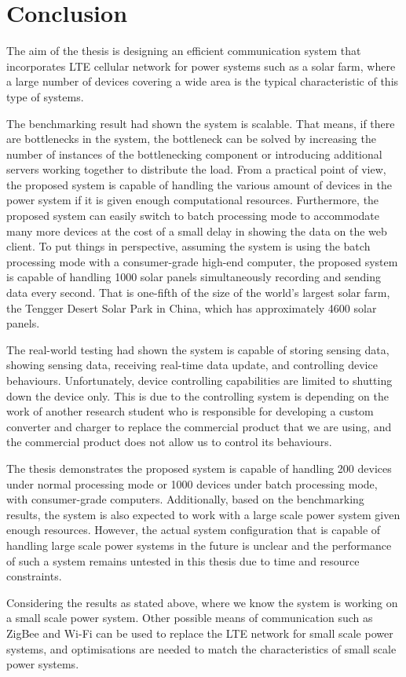 \documentclass[../thesis.tex]{subfiles}
\begin{document}
\chapter{Conclusion}
\label{chap:conclu}

The aim of the thesis is designing an efficient communication system that incorporates LTE cellular network for power systems such as a solar farm, where a large number of devices covering a wide area is the typical characteristic of this type of systems.

The benchmarking result had shown the system is scalable. That means, if there are bottlenecks in the system, the bottleneck can be solved by increasing the number of instances of the bottlenecking component or introducing additional servers working together to distribute the load. From a practical point of view, the proposed system is capable of handling the various amount of devices in the power system if it is given enough computational resources. Furthermore, the proposed system can easily switch to batch processing mode to accommodate many more devices at the cost of a small delay in showing the data on the web client. To put things in perspective, assuming the system is using the batch processing mode with a consumer-grade high-end computer, the proposed system is capable of handling 1000 solar panels simultaneously recording and sending data every second. That is one-fifth of the size of the world's largest solar farm, the Tengger Desert Solar Park in China, which has approximately 4600 solar panels\cite{gienergy}.

The real-world testing had shown the system is capable of storing sensing data, showing sensing data, receiving real-time data update, and controlling device behaviours. Unfortunately, device controlling capabilities are limited to shutting down the device only. This is due to the controlling system is depending on the work of another research student who is responsible for developing a custom converter and charger to replace the commercial product that we are using, and the commercial product does not allow us to control its behaviours.

The thesis demonstrates the proposed system is capable of handling 200 devices under normal processing mode or 1000 devices under batch processing mode, with consumer-grade computers. Additionally, based on the benchmarking results, the system is also expected to work with a large scale power system given enough resources. However, the actual system configuration that is capable of handling large scale power systems in the future is unclear and the performance of such a system remains untested in this thesis due to time and resource constraints.

Considering the results as stated above, where we know the system is working on a small scale power system. Other possible means of communication such as ZigBee and Wi-Fi can be used to replace the LTE network for small scale power systems, and optimisations are needed to match the characteristics of small scale power systems.
\end{document}

